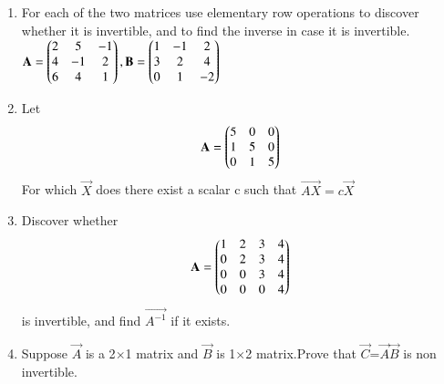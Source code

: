 \renewcommand{\theequation}{\theenumi}
\renewcommand{\thefigure}{\theenumi}
\begin{enumerate}[label=\thesubsection.\arabic*.,ref=\thesubsection.\theenumi]
%
\item For each of the two matrices use elementary row operations to discover whether it is invertible, and to find the inverse in case it is invertible.\\

$\mathbf{A}=\begin{pmatrix}2&5&-1\\4&-1&2\\6&4&1\end{pmatrix},
\mathbf{B}=\begin{pmatrix}1&-1&2\\3&2&4\\0&1&-2\end{pmatrix}$
%
\\
%
\solution

\item Let 
\begin{align}
	\mathbf{A} = \begin{pmatrix}5 & 0 & 0\\1 & 5 & 0\\0 & 1 & 5\end{pmatrix}
\end{align}
For which $\vec{X}$ does there exist a scalar c such that $\vec{AX} = c \vec{X}$
%
\\
%
\solution

\item Discover whether
\begin{align}
	\mathbf{A}=\begin{pmatrix} 1 & 2 & 3 & 4 \\
			0 & 2 & 3 & 4 \\
			0 & 0 & 3 & 4 \\
			0 & 0 & 0 & 4\end{pmatrix}
\end{align}
is invertible, and find $\vec{A^{-1}}$ if it exists.
\\
%
\solution

%
\item Suppose $\vec{A}$ is a 2$\times$1  matrix and $\vec{B}$ is 1$\times$2 matrix.Prove that $\vec{C}$=$\vec{A}$$\vec{B}$ is non invertible.


\end{enumerate}
